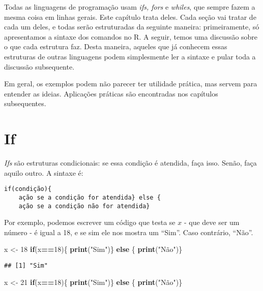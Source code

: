 \documentclass[
]{book}
\newenvironment{Shaded}{\begin{snugshade}}{\end{snugshade}}
\newcommand{\ControlFlowTok}[1]{\textcolor[rgb]{0.13,0.29,0.53}{\textbf{#1}}}
\newcommand{\DecValTok}[1]{\textcolor[rgb]{0.00,0.00,0.81}{#1}}
\newcommand{\KeywordTok}[1]{\textcolor[rgb]{0.13,0.29,0.53}{\textbf{#1}}}
\newcommand{\NormalTok}[1]{#1}
\newcommand{\OperatorTok}[1]{\textcolor[rgb]{0.81,0.36,0.00}{\textbf{#1}}}
\newcommand{\StringTok}[1]{\textcolor[rgb]{0.31,0.60,0.02}{#1}}
\begin{document}
Todas as linguagens de programação usam \emph{ifs, fors} e \emph{whiles}, que sempre fazem a mesma coisa em linhas gerais. Este capítulo trata deles. Cada seção vai tratar de cada um deles, e todas serão estruturadas da seguinte maneira: primeiramente, só apresentamos a sintaxe dos comandos no R. A seguir, temos uma discussão sobre o que cada estrutura faz. Desta maneira, aqueles que já conhecem essas estruturas de outras linguagens podem simplesmente ler a sintaxe e pular toda a discussão subsequente.

Em geral, os exemplos podem não parecer ter utilidade prática, mas servem para entender as ideias. Aplicações práticas são encontradas nos capítulos subsequentes.

\hypertarget{if}{%
\section{If}\label{if}}

\emph{Ifs} são estruturas condicionais: se essa condição é atendida, faça isso. Senão, faça aquilo outro. A sintaxe é:

\begin{verbatim}
if(condição){
    ação se a condição for atendida} else {
    ação se a condição não for atendida}
\end{verbatim}

Por exemplo, podemos escrever um código que testa se \(x\) - que deve ser um número - é igual a 18, e se sim ele nos mostra um ``Sim''. Caso contrário, ``Não''.

\begin{Shaded}
\begin{Highlighting}[]
\NormalTok{x \textless{}{-}}\StringTok{ }\DecValTok{18}
\ControlFlowTok{if}\NormalTok{(x}\OperatorTok{==}\DecValTok{18}\NormalTok{)\{}
    \KeywordTok{print}\NormalTok{(}\StringTok{"Sim"}\NormalTok{)\} }\ControlFlowTok{else}\NormalTok{ \{}
    \KeywordTok{print}\NormalTok{(}\StringTok{"Não"}\NormalTok{)\}}
\end{Highlighting}
\end{Shaded}

\begin{verbatim}
## [1] "Sim"
\end{verbatim}

\begin{Shaded}
\begin{Highlighting}[]
\NormalTok{x \textless{}{-}}\StringTok{ }\DecValTok{21}
\ControlFlowTok{if}\NormalTok{(x}\OperatorTok{==}\DecValTok{18}\NormalTok{)\{}
    \KeywordTok{print}\NormalTok{(}\StringTok{"Sim"}\NormalTok{)\} }\ControlFlowTok{else}\NormalTok{ \{}
    \KeywordTok{print}\NormalTok{(}\StringTok{"Não"}\NormalTok{)\}}
\end{Highlighting}
\end{Shaded}
\end{document}
